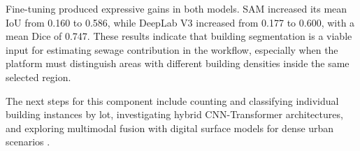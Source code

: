 Fine-tuning produced expressive gains in both models.
SAM increased its mean IoU from 0.160 to 0.586, while DeepLab V3 increased from 0.177 to 0.600, with a mean Dice of 0.747.
These results indicate that building segmentation is a viable input for estimating sewage contribution in the \method workflow, especially when the platform must distinguish areas with different building densities inside the same selected region.

The next steps for this component include counting and classifying individual building instances by lot, investigating hybrid CNN-Transformer architectures, and exploring multimodal fusion with digital surface models for dense urban scenarios \cite{zhou2024hierarchical}.
